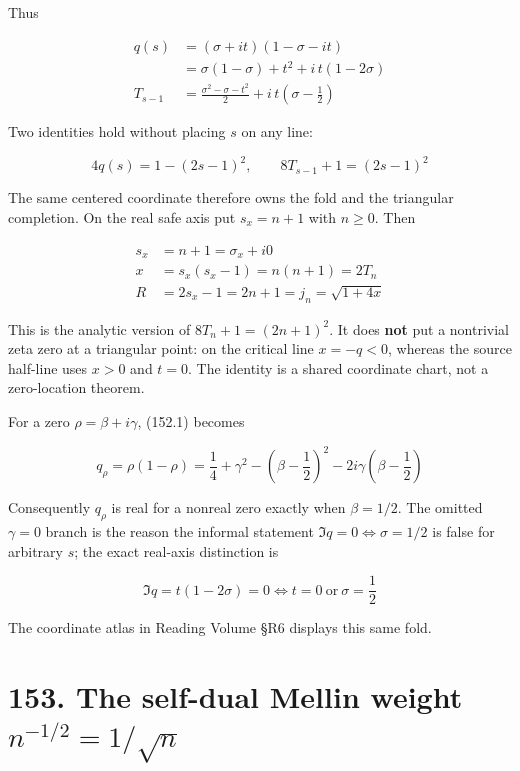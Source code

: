 \documentclass[
  11pt,
]{book}
\begin{document}
Thus

\[
\boxed{
\begin{aligned}
q(s)
&=(\sigma+it)(1-\sigma-it)\\
&=\sigma(1-\sigma)+t^2+i\,t(1-2\sigma)\\[1mm]
T_{s-1}
&=\frac{\sigma^2-\sigma-t^2}{2}
+i\,t\!\left(\sigma-\frac12\right)
\end{aligned}}
\tag{152.1}
\]

Two identities hold without placing \(s\) on any line:

\[
\boxed{
4q(s)=1-(2s-1)^2,\qquad
8T_{s-1}+1=(2s-1)^2}
\tag{152.2}
\]

The same centered coordinate therefore owns the fold and the triangular
completion. On the real safe axis put \(s_x=n+1\) with \(n\ge0\). Then

\[
\boxed{\begin{aligned}
s_x&=n+1=\sigma_x+i0\\
x&=s_x(s_x-1)=n(n+1)=2T_n\\
R&=2s_x-1=2n+1=j_n=\sqrt{1+4x}
\end{aligned}}
\tag{152.3}
\]

This is the analytic version of \(8T_n+1=(2n+1)^2\). It does
\textbf{not} put a nontrivial zeta zero at a triangular point: on the
critical line \(x=-q<0\), whereas the source half-line uses \(x>0\) and
\(t=0\). The identity is a shared coordinate chart, not a zero-location
theorem.

For a zero \(\rho=\beta+i\gamma\), (152.1) becomes

\[
\boxed{
q_\rho=\rho(1-\rho)
=\frac14+\gamma^2-\left(\beta-\frac12\right)^2
-2i\gamma\left(\beta-\frac12\right)}
\tag{152.4}
\]

Consequently \(q_\rho\) is real for a nonreal zero exactly when
\(\beta=1/2\). The omitted \(\gamma=0\) branch is the reason the
informal statement \(\Im q=0\iff\sigma=1/2\) is false for arbitrary
\(s\); the exact real-axis distinction is

\[
\Im q=t(1-2\sigma)=0
\iff t=0\ \text{or}\ \sigma=\frac12
\tag{152.5}
\]

The coordinate atlas in Reading Volume §R6 displays this same fold.

\section{\texorpdfstring{153. The self-dual Mellin weight
\(n^{-1/2}=1/\sqrt n\)}{153. The self-dual Mellin weight n\^{}\{-1/2\}=1/\textbackslash sqrt n}}\label{the-self-dual-mellin-weight-n-121sqrt-n}
\end{document}
